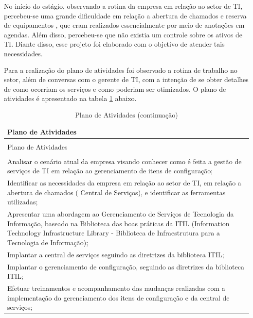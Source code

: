 \documentclass[eso]{bcc}
\begin{document}
No início do estágio, observando a rotina da empresa em relação ao setor de TI, percebeu-se uma grande dificuldade em relação a abertura de chamados e reserva de equipamentos , que eram realizados essencialmente por meio de anotações em agendas. Além disso, percebeu-se que não existia um controle sobre os ativos de TI. Diante disso, esse projeto foi elaborado  com o objetivo de atender tais necessidades.

Para a realização do plano de atividades foi observado a rotina de trabalho no setor, além de conversas com o gerente de TI, com a intenção de se obter detalhes de como ocorriam os serviços e como poderiam ser otimizados.
O plano de atividades é apresentado na tabela \ref{tab:atividades3} abaixo.


%
%
%

\begin{longtable}[c]{p{10cm}}
  \caption{Plano de Atividades\label{tab:atividades3}} \\
  \hline
  Plano de Atividades \\
  \hline\hline
  \endfirsthead
  \caption[]{Plano de Atividades (continuação)} \\
  \hline
  Plano de Atividades  \\
  \hline\hline
  \endhead
  \hline\hline
  \endlastfoot
  \hline
  \multicolumn{1}{r}{\footnotesize{}continua na próxima página} \\
  \endfoot
\hline
Analisar o cenário atual da empresa visando conhecer como é feita a gestão de serviços de TI em relação ao gerenciamento de itens de configuração;\\
\hline
Identificar as necessidades da empresa em relação ao setor de TI, em relação a abertura de chamados ( Central de Serviços), e identificar as ferramentas utilizadas;\\
\hline
Apresentar uma abordagem ao Gerenciamento de Serviços de Tecnologia da Informação, baseado na Biblioteca das boas práticas da ITIL (Information Technology Infrastructure Library - Biblioteca de Infraestrutura para a Tecnologia de Informação);\\
\hline
Implantar a central de serviços seguindo as diretrizes da biblioteca ITIL;\\
\hline
Implantar o gerenciamento de configuração, seguindo as diretrizes da biblioteca ITIL;\\
\hline
Efetuar treinamentos e acompanhamento das mudanças realizadas com a implementação do gerenciamento dos itens de configuração e da central de serviços;\\
\hline
  
 \end{longtable}
\end{document}
